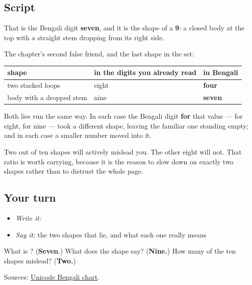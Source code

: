 \subsection*{Script}
\begin{quote}
\end{quote}

That is the Bengali digit \textbf{seven}, and it is the shape of a \textbf{9}: a closed body at the top with a straight stem dropping from its right side.

The chapter's second false friend, and the last shape in the set:

\noindent
\begin{tabularx}{\linewidth}{@{}>{\raggedright\arraybackslash}X>{\raggedright\arraybackslash}X>{\raggedright\arraybackslash}X@{}}
\toprule
\textbf{shape} & \textbf{in the digits you already read} & \textbf{in Bengali} \\
\midrule
two stacked loops & eight & \textbf{four} \\
body with a dropped stem & nine & \textbf{seven} \\
\bottomrule
\end{tabularx}

Both lies run the same way. In each case the Bengali digit \textbf{for} that value — \textbf{} for eight, \textbf{} for nine — took a different shape, leaving the familiar one standing empty; and in each case a smaller number moved into it.

Two out of ten shapes will actively mislead you. The other eight will not. That ratio is worth carrying, because it is the reason to slow down on exactly two shapes rather than to distrust the whole page.

\subsection*{Your turn}
\begin{itemize}
\raggedright
  \item \emph{Write it:} 
  \item \emph{Say it:} the two shapes that lie, and what each one really means
\end{itemize}

\begin{tcolorbox}[breakable,colback=teal!4,colframe=teal!35!black,title={Before you move on}]
What is \textbf{}? (\textbf{Seven}.) What does the shape say? (\textbf{Nine.}) How many of the ten shapes mislead? (\textbf{Two.})

Sources: \href{https://www.unicode.org/charts/PDF/U0980.pdf}{Unicode Bengali chart}.
\end{tcolorbox}
